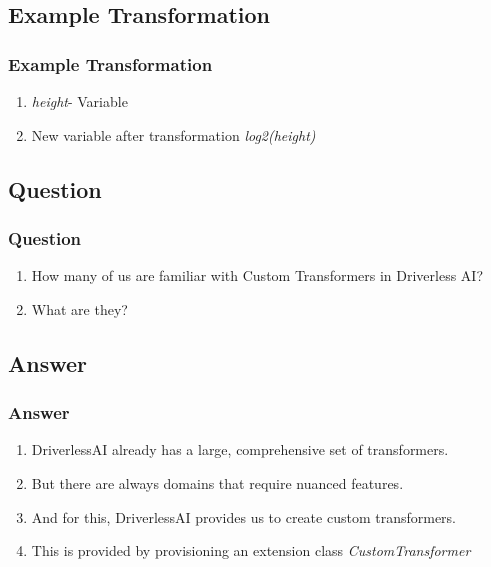 \documentclass[11pt,
               aspectratio=169,
               hyperref={colorlinks}
               ]{beamer}
\begin{document}
	\subsection{Example Transformation}
	\begin{frame}[fragile]
		\frametitle{Example Transformation}
		\begin{enumerate}
			\item \textit{height}- Variable
			\item New variable after transformation \textit{log2(height)}
		\end{enumerate}
\end{frame}
	\subsection{Question}
	\begin{frame}
		\frametitle{Question}
		\begin{enumerate}
			\item How many of us are familiar with Custom Transformers in Driverless AI?
			\item What are they?
		\end{enumerate}
	\end{frame}
	\subsection{Answer}
	\begin{frame}
		\frametitle{Answer}
		\begin{enumerate}
			\item DriverlessAI already has a large, comprehensive set of transformers. 
			\item But there are always domains that require nuanced features. 
			\item And for this, DriverlessAI provides us to create custom transformers. 
			\item This is provided by provisioning an extension class \textit{CustomTransformer}
		\end{enumerate}
	\end{frame}
\end{document}

